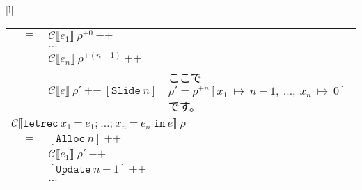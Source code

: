 \documentclass{jarticle}
\begin{document}
\begin{tabular} {|l|}
\begin{tabular}{l c l l}
		                                                     & $=$ & $\mathcal{C} \llbracket e_1 \rrbracket ~ \rho^{+0} ~ \texttt{++}$                               &                                                                                                      \\
		                                                     &     & $\ldots$                                                                                        &                                                                                                      \\
		                                                     &     & $\mathcal{C} \llbracket e_n \rrbracket ~ \rho^{+(n - 1)} ~ \texttt{++}$                         &                                                                                                      \\
		                                                     &     & $\mathcal{C} \llbracket e \rrbracket ~ \rho' ~ \texttt{++} ~ \left[\texttt{Slide} ~ n\right]$   & ここで $\rho' = \rho^{+n} \left[x_1 ~ \mapsto ~ n - 1, ~ \ldots , ~ x_n ~ \mapsto ~ 0\right]$ です。 \\
		\multicolumn{4}{l}{$\mathcal{C} \llbracket \texttt{letrec} ~ x_1 ~ \texttt{=} ~ e_1\texttt{;} ~  \ldots \texttt{;} ~ x_n ~ \texttt{=} ~ e_n ~ \texttt{in} ~ e \rrbracket ~ \rho$}                                                                                   \\
		                                                     & $=$ & $\left[\texttt{Alloc} ~ n\right] ~ \texttt{++}$                                                 &                                                                                                      \\
		                                                     &     & $\mathcal{C} \llbracket e_1 \rrbracket ~ \rho' ~ \texttt{++}$                                   &                                                                                                      \\
		                                                     &     & $\left[\texttt{Update} ~ n - 1\right] ~ \texttt{++}$                                            &                                                                                                      \\
		                                                     &     & $\ldots$                                                                                        &                                                                                                      \\

\end{tabular}
\end{tabular}
\end{document}
